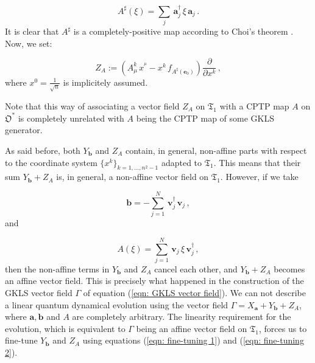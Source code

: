 \documentclass[11pt]{article}
\newcommand{\be}{\begin{equation}}
\newcommand{\ee}{\end{equation}}
\newcommand{\vsp}{\vspace{0.4cm}}
\newcommand{\obsp}{\mathfrak{O}}
\begin{document}
\be
A^{\sharp}(\xi)=\sum_{j}\,\mathbf{a}_{j}^{\dagger}\,\xi\,\mathbf{a}_{j}\,.
\ee
It is clear that $A^{\sharp}$ is  a completely-positive map according to Choi's theorem  \cite{choi-completely_positive_linear_maps_on_complex_matrices}.
Now, we set:

\be
Z_{A}:=\left(A_{\mu}^{k}\,x^{^{\mu}}  - x^{k} \,f_{A^{\sharp}(\mathbf{e}_{0})}\right) \frac{\partial}{\partial x^{k}}\,,
\ee
where $x^{0}=\frac{1}{\sqrt{n}}$ is implicitely assumed.

Note that this way of associating a vector field $Z_{A}$ on $\mathfrak{T}_{1}$ with a CPTP map $A$ on $\obsp^{*}$ is completely unrelated with $A$ being the CPTP map of some GKLS generator.

\vsp

As said before, both $Y_{\mathbf{b}}$ and $Z_{A}$ contain, in general, non-affine parts with respect to the coordinate system $\{x^{k}\}_{k=1,...,n^{2}-1}$ adapted to $\mathfrak{T}_{1}$.
This means that their sum $Y_{\mathbf{b}} + Z_{A}$ is, in general, a non-affine vector field on $\mathfrak{T}_{1}$.
However,  if we take 

\be\label{eqn: fine-tuning 1}
\mathbf{b}=-\sum_{j=1}^{N}\,\mathbf{v}^{\dagger}_{j}\,\mathbf{v}_{j}\,,
\ee
and

\be\label{eqn: fine-tuning 2}
A(\xi)=\sum_{j=1}^{N}\,\mathbf{v}_{j}\,\xi\,\mathbf{v}_{j}^{\dagger}\,,
\ee
then the non-affine terms in $Y_{\mathbf{b}}$ and $Z_{A}$ cancel each other, and $Y_{\mathbf{b}} + Z_{A}$ becomes an affine vector field.
This is precisely what happened in the construction of the GKLS vector field $\Gamma$ of equation (\ref{eqn: GKLS vector field}).
We can not describe a linear quantum dynamical evolution using the vector field $\Gamma=X_{\mathbf{a}} + Y_{\mathbf{b}} + Z_{A}$, where $\mathbf{a},\mathbf{b}$ and $A$ are completely arbitrary.
The linearity requirement for the evolution, which is equivalent to $\Gamma$ being an affine vector field on $\mathfrak{T}_{1}$, forces us to  fine-tune $Y_{\mathbf{b}}$ and $Z_{A}$ using equations (\ref{eqn: fine-tuning 1}) and (\ref{eqn: fine-tuning 2}).

\vsp
\end{document}
